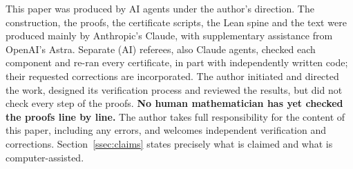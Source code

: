 This paper was produced by AI agents under the author's direction. The construction, the proofs, the certificate scripts, the Lean spine and
the text were produced mainly by Anthropic's Claude, with supplementary assistance from OpenAI's Astra. Separate (AI) referees, also Claude
agents, checked each component and re-ran every certificate, in part with independently written code; their requested corrections are
incorporated. The author initiated and directed the work, designed its verification process and reviewed the results, but did not check
every step of the proofs. \textbf{No human mathematician has yet checked the proofs line by line.} The author takes full responsibility for the
content of this paper, including any errors, and welcomes independent verification and corrections. Section~\ref{ssec:claims} states
precisely what is claimed and what is computer-assisted.
